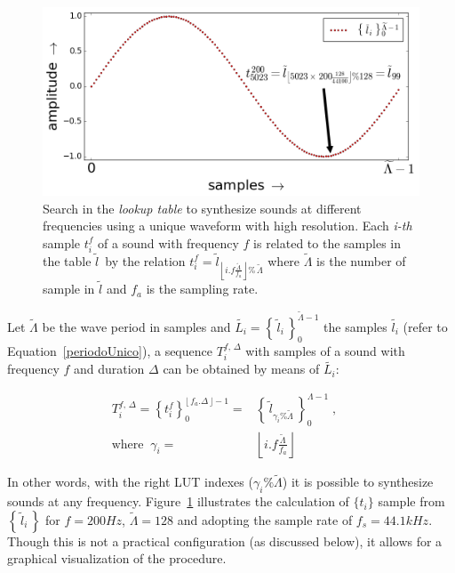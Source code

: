\begin{figure}
    \centering
        \includegraphics[width=.7\textwidth]{figures/lut_}
    \caption{Search in the \emph{lookup table} to synthesize sounds at different frequencies using a unique waveform with high resolution.
	Each \emph{i-th} sample $t_i^f$ of a sound with frequency $f$ is related to the samples in the table $\widetilde{l}$\, by the relation $t_i^{f}=\widetilde{l}_{\left\lfloor i.f\frac{\widetilde{\Lambda}}{f_a} \right\rfloor \%\,\widetilde{\Lambda}}$ where $\widetilde{\Lambda}$ is the number of sample in $\widetilde{l}$ and $f_a$ is the sampling rate.}
        \label{fig:lut}
\end{figure}

Let $\widetilde{\Lambda}$ be the wave period in samples and $\widetilde{L_i} = \left\{\, \widetilde{l}_i \,\right\}_0^{\widetilde{\Lambda} -1}$ the samples $\widetilde{l_i}$ (refer to Equation~\ref{periodoUnico}), a sequence $T_i^{f,\,\Delta}$ with samples of a sound with frequency $f$ and duration $\Delta$ can be obtained by means of $\widetilde{L_i}$:

\begin{equation}\label{eq:lut}
\begin{split}
T_i^{f,\,\Delta}=\left\{t_i^f\right\}_0^{\lfloor \, f_a . \Delta \, \rfloor -1} = & \left\{ \, \widetilde{l}_{\gamma_i \% \widetilde{\Lambda} }\, \right\}_{0}^{\Lambda-1}\; , \quad \\ \text{where} \;\; \gamma_i = & \left \lfloor i . f \frac{ \widetilde{\Lambda}}{f_a} \right \rfloor  
\end{split}
\end{equation}

In other words, with the right LUT indexes ($\gamma_i\%\widetilde{\Lambda}$) it is possible to synthesize sounds at any frequency. Figure~\ref{fig:lut} illustrates the calculation of $\{t_i\}$ sample from $\left\{\,\widetilde{l}_i\,\right\}$ for $f=200Hz$, $\widetilde{\Lambda}=128$ and adopting the sample rate of $f_s=44.1kHz$. Though this is not a practical configuration (as discussed below), it allows for a graphical visualization of the procedure.

